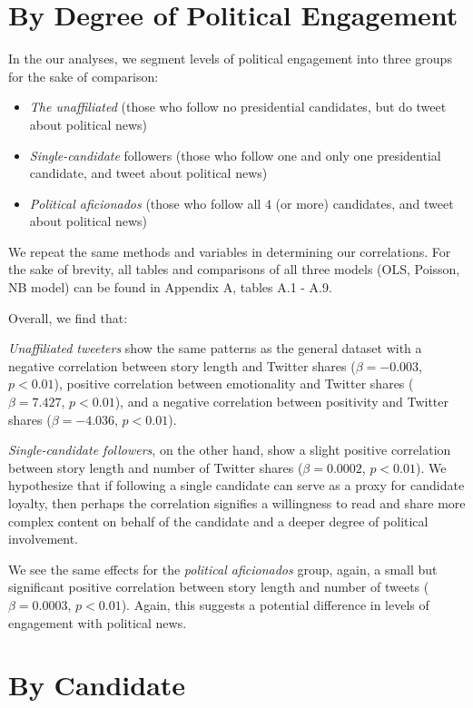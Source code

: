 \section{By Degree of Political Engagement}

In the our analyses, we segment levels of political engagement into three groups for the sake of comparison:

\begin{itemize}
  \item \emph{The unaffiliated} (those who follow no presidential candidates, but do tweet about political news)
  \item \emph{Single-candidate} followers (those who follow one and only one presidential candidate, and tweet about political news)
  \item \emph{Political aficionados} (those who follow all 4 (or more) candidates, and tweet about political news)
\end{itemize}

We repeat the same methods and variables in determining our correlations. For the sake of brevity, all tables and comparisons of all three models (OLS, Poisson, NB model) can be found in Appendix A, tables A.1 - A.9.

Overall, we find that: 

\emph{Unaffiliated tweeters} show the same patterns as the general dataset with a negative correlation between story length and Twitter shares ($\beta=-0.003$, $p<0.01$), positive correlation between emotionality and Twitter shares ($\beta=7.427$, $p<0.01$), and a negative correlation between positivity and Twitter shares ($\beta=-4.036$, $p<0.01$).

\emph{Single-candidate followers}, on the other hand, show a slight positive correlation between story length and number of Twitter shares ($\beta=0.0002$, $p<0.01$). We hypothesize that if following a single candidate can serve as a proxy for candidate loyalty, then perhaps the correlation signifies a willingness to read and share more complex content on behalf of the candidate and a deeper degree of political involvement.

We see the same effects for the \emph{political aficionados} group, again, a small but significant positive correlation between story length and number of tweets ($\beta=0.0003$, $p<0.01$). Again, this suggests a potential difference in levels of engagement with political news.


\section{By Candidate} 

